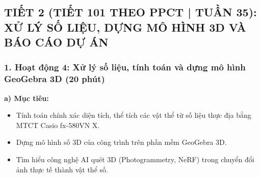 \documentclass[12pt, a4paper]{article}
\begin{document}
\vspace{10pt}

\subsection*{TIẾT 2 (TIẾT 101 THEO PPCT | TUẦN 35): XỬ LÝ SỐ LIỆU, DỰNG MÔ HÌNH 3D VÀ BÁO CÁO DỰ ÁN}

\subsubsection*{1. Hoạt động 4: Xử lý số liệu, tính toán và dựng mô hình GeoGebra 3D (20 phút)}

\noindent \textbf{a) Mục tiêu:}
\begin{itemize}[leftmargin=0.6cm]
    \item Tính toán chính xác diện tích, thể tích các vật thể từ số liệu thực địa bằng MTCT Casio fx-580VN X.
    \item Dựng mô hình số 3D của công trình trên phần mềm GeoGebra 3D.
    \item Tìm hiểu công nghệ AI quét 3D (Photogrammetry, NeRF) trong chuyển đổi ảnh thực tế thành vật thể số.
\end{itemize}
\end{document}
